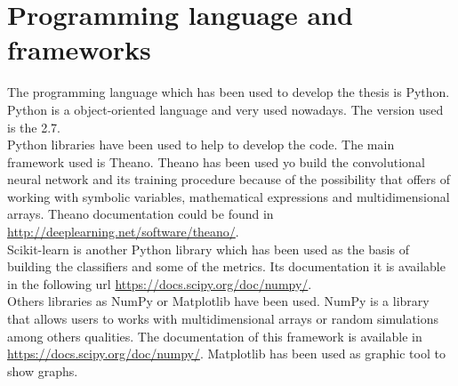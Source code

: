 \section{Programming language and frameworks}
The  programming language which has been used to develop the thesis is Python. Python is a object-oriented language and very used nowadays. The version used is the 2.7.\\

Python libraries have been used to help to develop the code. The main framework used is Theano. Theano has been used yo build the convolutional neural network and its training procedure because of the possibility that offers of working with symbolic variables, mathematical expressions and multidimensional arrays. Theano documentation could be found in \url{http://deeplearning.net/software/theano/}.\\

Scikit-learn is another Python library which has been used as the basis of building the classifiers and some of the metrics. Its documentation it is available in the following url \url{https://docs.scipy.org/doc/numpy/}.\\

Others libraries as NumPy or Matplotlib have been used. NumPy is a library that allows users to works with multidimensional arrays or random simulations among others qualities. The documentation of this framework is available in \url{https://docs.scipy.org/doc/numpy/}. Matplotlib has been used as graphic tool to show graphs.\\

